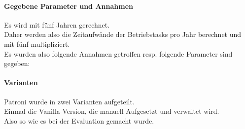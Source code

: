 
\begin{flushleft}
    \paragraph{Gegebene Parameter und Annahmen}
    Es wird mit fünf Jahren gerechnet.\\
    Daher werden also die Zeitaufwände der Betriebstasks pro Jahr berechnet und mit fünf multipliziert.\\
    Es wurden also folgende Annahmen getroffen resp. folgende Parameter sind gegeben:
    
    \paragraph{Varianten}
    Patroni wurde in zwei Varianten aufgeteilt.\\
    Einmal die Vanilla-Version, die manuell Aufgesetzt und verwaltet wird.\\
    Also so wie es bei der Evaluation gemacht wurde.
\end{flushleft}
